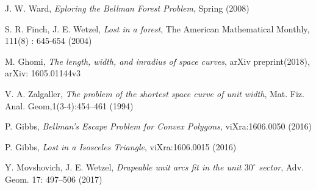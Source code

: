 \documentclass[11pt,letter]{article}
\begin{document}
 
\begin{thebibliography}{99}


    J. W. Ward,
    \textit{Eploring the Bellman Forest Problem},
    Spring (2008)

	S. R. Finch, J. E. Wetzel,
	\textit{Lost in a forest},
	The American Mathematical Monthly, 111(8) : 645-654 (2004)

 	M. Ghomi,
	\textit{The length, width, and inradius of space curves},
	arXiv preprint(2018), arXiv: 1605.01144v3

	V. A. Zalgaller,
	\textit{ The problem of the shortest space curve of unit width},
	 Mat. Fiz. Anal. Geom,1(3-4):454–461 (1994)

	P. Gibbs, 
	\textit{Bellman’s Escape Problem for Convex Polygons},
	viXra:1606.0050 (2016)

	P. Gibbs,
	\textit{Lost in a Isosceles Triangle},
	viXra:1606.0015 (2016)

	Y. Movshovich, J. E. Wetzel,
	\textit{Drapeable unit arcs fit in the unit $30^\circ$ sector},
	 Adv. Geom. 17: 497–506 (2017)


\end{thebibliography}
\end{document}
